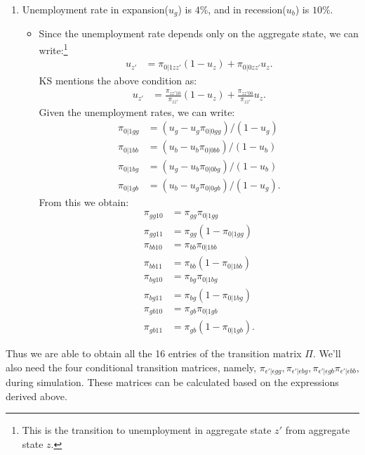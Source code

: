 \documentclass[12pt]{article}
\begin{document}
\begin{enumerate}
\item Unemployment rate in expansion($u_g$) is $4 \%$, and in recession($u_b$) is $10 \%$.
\begin{itemize}
\item Since the unemployment rate depends only on the aggregate state, we can write:\footnote{This is the transition to unemployment in aggregate state $z'$ from aggregate state $z$.}
\begin{align*}
u_{z'} & = \pi_{0|1zz'}(1-u_z) + \pi_{0|0zz'} u_z.
\end{align*}
KS mentions the above condition as:
\begin{align*}
u_{z'} & =  \frac{\pi_{zz'10}}{\pi_{zz'}}(1-u_z) + \frac{\pi_{zz'00}}{\pi_{zz'}} u_z.
\end{align*}
Given the unemployment rates, we can write:
\begin{align*}
\pi_{0|1 gg} & = (u_g - u_g\pi_{0|0gg})/(1-u_g)\\
\pi_{0|1 bb} & = (u_b - u_b\pi_{0|0bb})/(1-u_b) \\
\pi_{0|1 bg} & = (u_g - u_b\pi_{0|0bg})/(1-u_b)\\
\pi_{0|1 gb} & = (u_b - u_g\pi_{0|0gb})/(1-u_g).
\end{align*}
From this we obtain:
\begin{align*}
\pi_{gg10} & = \pi_{gg}\pi_{0|1gg} \\
\pi_{gg11} & = \pi_{gg}(1-\pi_{0|1gg}) \\
\pi_{bb10} & = \pi_{bb}\pi_{0|1bb} \\
\pi_{bb11} & = \pi_{bb}(1-\pi_{0|1bb})\\
\pi_{bg10} & = \pi_{bg}\pi_{0|1bg} \\
\pi_{bg11} & = \pi_{bg}(1-\pi_{0|1bg}) \\
\pi_{gb10} & = \pi_{gb}\pi_{0|1gb} \\
\pi_{gb11} & = \pi_{gb}(1-\pi_{0|1gb}).
\end{align*}
\end{itemize}
\end{enumerate}
Thus we are able to obtain all the 16 entries of the transition matrix $\Pi.$ We'll also need the four conditional transition matrices, namely, $\pi_{\epsilon'|\epsilon gg},\pi_{\epsilon'|\epsilon bg}, \pi_{\epsilon'|\epsilon gb}\pi_{\epsilon'|\epsilon bb}$, during simulation. These matrices can be calculated based on the expressions derived above. 
\end{document}
